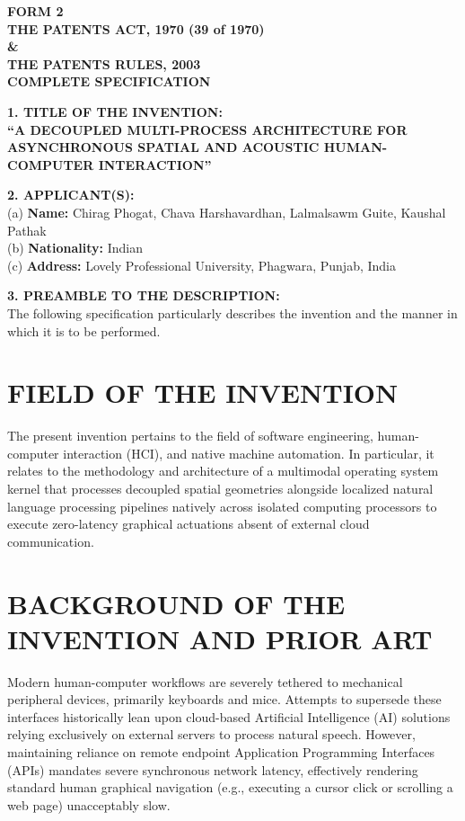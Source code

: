 \documentclass[12pt, a4paper]{article}
\begin{document}
\begin{center}
    \textbf{\Large FORM 2} \\
    \textbf{THE PATENTS ACT, 1970 (39 of 1970)} \\
    \textbf{\&} \\
    \textbf{THE PATENTS RULES, 2003} \\
    \vspace{1cm}
    \textbf{\Large COMPLETE SPECIFICATION} \\
    [See section 10 and rule 13]
\end{center}

\vspace{1cm}

\noindent \textbf{1. TITLE OF THE INVENTION:} \\
\textbf{``A DECOUPLED MULTI-PROCESS ARCHITECTURE FOR ASYNCHRONOUS SPATIAL AND ACOUSTIC HUMAN-COMPUTER INTERACTION''}

\vspace{1cm}

\noindent \textbf{2. APPLICANT(S):} \\
(a) \textbf{Name:} Chirag Phogat, Chava Harshavardhan, Lalmalsawm Guite, Kaushal Pathak \\
(b) \textbf{Nationality:} Indian \\
(c) \textbf{Address:} Lovely Professional University, Phagwara, Punjab, India

\vspace{1cm}

\noindent \textbf{3. PREAMBLE TO THE DESCRIPTION:} \\
The following specification particularly describes the invention and the manner in which it is to be performed.

\newpage

\section*{FIELD OF THE INVENTION}
The present invention pertains to the field of software engineering, human-computer interaction (HCI), and native machine automation. In particular, it relates to the methodology and architecture of a multimodal operating system kernel that processes decoupled spatial geometries alongside localized natural language processing pipelines natively across isolated computing processors to execute zero-latency graphical actuations absent of external cloud communication.

\section*{BACKGROUND OF THE INVENTION AND PRIOR ART}
Modern human-computer workflows are severely tethered to mechanical peripheral devices, primarily keyboards and mice. Attempts to supersede these interfaces historically lean upon cloud-based Artificial Intelligence (AI) solutions relying exclusively on external servers to process natural speech. However, maintaining reliance on remote endpoint Application Programming Interfaces (APIs) mandates severe synchronous network latency, effectively rendering standard human graphical navigation (e.g., executing a cursor click or scrolling a web page) unacceptably slow.
\end{document}
